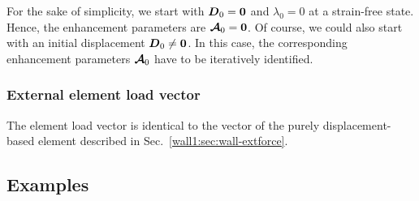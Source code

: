  For the sake of simplicity, we start with $\boldsymbol{D}_0=\boldsymbol{0}$
and $\lambda_0=0$ at a strain-free state. Hence, the enhancement parameters
are $\boldsymbol{\mathcal{A}}_0=\boldsymbol{0}$. Of course, we could also start with
an initial displacement $\boldsymbol{D}_0\neq\boldsymbol{0}$. In this case, the
corresponding enhancement parameters $\boldsymbol{\mathcal{A}}_0$ have to be iteratively
identified. 

\subsubsection{External element load vector}
The element load vector is identical to the vector of the purely
displacement-based element described in Sec.~\ref{wall1:sec:wall-extforce}.


\subsection{Examples}

